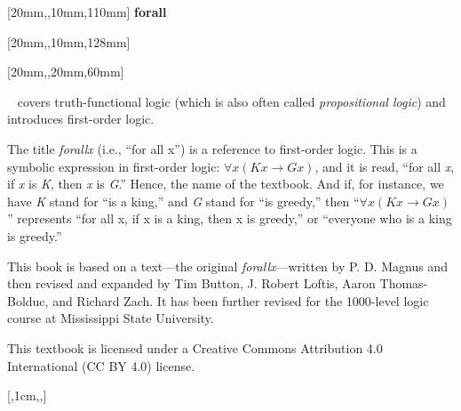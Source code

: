 \documentclass[coverheight=229mm, coverwidth=152mm, spinewidth=15.09mm]{bookcover}
\begin{document}
\begin{bookcover}

[20mm,,10mm,110mm]{\sffamily   %
\fontsize{44}{44}\selectfont\hfill \textbf{forall\textcolor{white}{x}}} 		%

[20mm,,10mm,128mm]{\sffamily
\fontsize{20}{20}\selectfont\hfill \textbf{\textls{\textcolor{white}{THE MISSISSIPPI STATE EDITION}}}}  




[20mm,,20mm,60mm]{\sffamily    %
\textcolor{white}{}~ covers truth-functional logic (which is also often called \textit{propositional logic}) and introduces first-order logic.

\quad The title \textit{forallx} (i.e., ``for all x'') is a reference to first-order logic. This is a symbolic expression in first-order logic: $\forall x(Kx \rightarrow Gx)$, and it is read, ``for all \textit{x}, if \textit{x} is \textit{K}, then \textit{x} is \textit{G}.'' Hence, the name of the textbook. And if, for instance, we have \textit{K} stand for ``is a king,'' and \textit{G} stand for ``is greedy,'' then ``$\forall x(Kx \rightarrow Gx)$'' represents ``for all x, if x is a king, then x is greedy,'' or ``everyone who is a king is greedy.''

\quad This book is based on a text---the original \textit{forallx}---written by P. D. Magnus and then revised and expanded by Tim Button, J. Robert Loftis, Aaron Thomas-Bolduc, and Richard Zach. It has been further revised for the 1000-level logic course at Mississippi State University.

\quad This textbook is licensed under a Creative Commons Attribution 4.0 International (CC BY 4.0) license.  
}


[,1cm,,]{
\vfill
\centering
{}
\colorbox{white}{%
}}

\end{bookcover}
\end{document}
